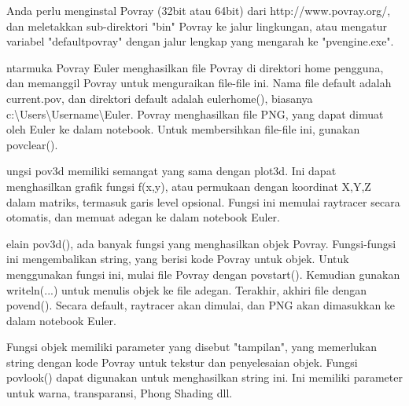 \documentclass[a4paper,10pt]{article}
\begin{document}
\begin{eulernotebook}
\begin{eulercomment}
Anda perlu menginstal Povray (32bit atau 64bit) dari
http://www.povray.org/, dan meletakkan sub-direktori "bin" Povray ke jalur lingkungan, atau mengatur variabel "defaultpovray" dengan jalur lengkap yang mengarah ke "pvengine.exe".


ntarmuka Povray Euler menghasilkan file Povray di direktori home
pengguna, dan memanggil Povray untuk menguraikan file-file ini. Nama
file default adalah current.pov, dan direktori default adalah
eulerhome(), biasanya c:\textbackslash{}Users\textbackslash{}Username\textbackslash{}Euler. Povray menghasilkan
file PNG, yang dapat dimuat oleh Euler ke dalam notebook. Untuk
membersihkan file-file ini, gunakan povclear().


ungsi pov3d memiliki semangat yang sama dengan plot3d. Ini dapat
menghasilkan grafik fungsi f(x,y), atau permukaan dengan koordinat
X,Y,Z dalam matriks, termasuk garis level opsional. Fungsi ini memulai
raytracer secara otomatis, dan memuat adegan ke dalam notebook Euler.


elain pov3d(), ada banyak fungsi yang menghasilkan objek Povray.
Fungsi-fungsi ini mengembalikan string, yang berisi kode Povray untuk
objek. Untuk menggunakan fungsi ini, mulai file Povray dengan
povstart(). Kemudian gunakan writeln(...) untuk menulis objek ke file
adegan. Terakhir, akhiri file dengan povend(). Secara default,
raytracer akan dimulai, dan PNG akan dimasukkan ke dalam notebook
Euler.

Fungsi objek memiliki parameter yang disebut "tampilan", yang
memerlukan string dengan kode Povray untuk tekstur dan penyelesaian
objek. Fungsi povlook() dapat digunakan untuk menghasilkan string ini.
Ini memiliki parameter untuk warna, transparansi, Phong Shading dll.



\end{eulercomment}
\end{eulernotebook}
\end{document}
